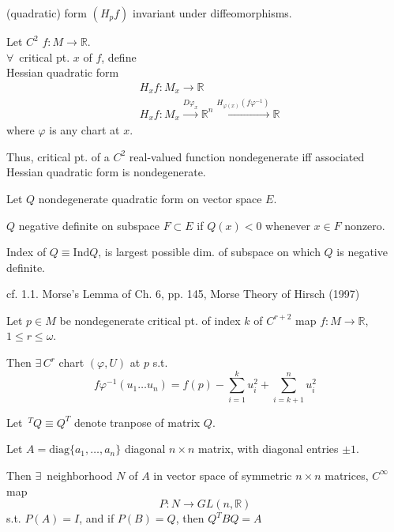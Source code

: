 (quadratic) form $(H_pf)$ invariant under diffeomorphisms.


Let $C^2$ $f:M\to \mathbb{R}$.  \\
$\forall \,$ critical pt. $x$ of $f$, define \\
Hessian quadratic form
\[
\begin{aligned}
  & H_xf : M_x \to \mathbb{R} \\ 
  & H_xf : M_x \xrightarrow{ D\varphi_x } \mathbb{R}^n \xrightarrow{ H_{\varphi(x)}(f\varphi^{-1} ) } \mathbb{R}
\end{aligned}
\]
where $\varphi$ is any chart at $x$.

Thus, critical pt. of a $C^2$ real-valued function nondegenerate iff associated Hessian quadratic form is nondegenerate.  

Let $Q$ nondegenerate quadratic form on vector space $E$.

$Q$ negative definite on subspace $F \subset E$ if $Q(x)<0$ whenever $x\in F$ nonzero.

Index of $Q \equiv \text{Ind}Q$, is largest possible dim. of subspace on which $Q$ is negative definite.








cf. 1.1. Morse's Lemma of  Ch. 6, pp. 145, Morse Theory of Hirsch (1997) \cite{dgdt:MHirsch1997}

\begin{lemma}
  Let $p\in M$ be nondegenerate critical pt. of index $k$ of $C^{r+2}$ map $f:M\to \mathbb{R}$, $1\leq r \leq \omega$.

  Then $\exists \, C^r$ chart $(\varphi,U)$ at $p$ s.t.
  \begin{equation}
    f\varphi^{-1}(u_1 \dots u_n) = f(p) - \sum_{i=1}^k u_i^2 + \sum_{i = k+1}^n u_i^2
  \end{equation}
  \end{lemma}

Let ${\,}^TQ \equiv Q^T$ denote tranpose of matrix $Q$.

\begin{lemma}
  Let $A = \text{diag}\lbrace a_1 , \dots , a_n \rbrace$ diagonal $n\times n$ matrix, with diagonal entries $\pm 1$.

  Then $\exists \, $ neighborhood $N$ of $A$ in vector space of symmetric $n\times n$ matrices, $C^{\infty}$ map
  \begin{equation}
P:N \to GL(n,\mathbb{R})
  \end{equation}
  s.t. $P(A)=I$, and if $P(B) = Q$, then $Q^T BQ = A$
\end{lemma}


